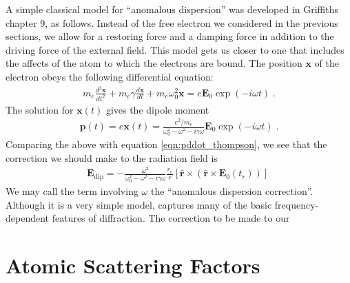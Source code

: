 \documentclass[12pt]{article}
\renewcommand{\vec}[1]{\boldsymbol{#1}}
\newcommand{\hvec}[1]{\hat{\vec{#1}}}
\begin{document}
A simple classical model for ``anomalous dispersion'' was developed in 
Griffiths chapter 9, as follows.  Instead of the free electron we considered in 
the previous sections, we allow for a restoring force and a damping force in 
addition to the driving force of the external field.  This model gets us 
closer to one that includes the affects of the atom to which the electrons 
are bound.  The position $\vec{x}$ of the electron obeys the following 
differential equation:
\begin{align}
m_e \frac{d^2\vec{x}}{dt^2} + m_e \gamma \frac{d\vec{x}}{dt} + m_e\omega_0^2 
\vec{x} = e \vec{E}_0 \exp(-i\omega t) \;.
\end{align}
The solution for $\vec{x}(t)$ gives the dipole moment
\begin{align}\label{eqn:dddipole}
\vec{p}(t) = e \vec{x}(t) = \frac{e^2/m_e}{\omega_0^2 - \omega^2 - i \gamma 
\omega}\vec{E}_0 \exp(-i\omega t) \;.
\end{align}
Comparing the above with equation \ref{eqn:pddot_thompson}, we see that the 
correction we should make to the radiation field is
\begin{align}
\vec{E}_\text{dip} =  -\frac{\omega^2}{\omega_0^2 - \omega^2 - i \gamma 
\omega}\frac{r_e}{r} [\hvec{r} \times ( \hvec{r} \times  
\vec{E}_0(t_r))] \;
\end{align}
We may call the term involving $\omega$ the ``anomalous dispersion correction''.
Although it is a very simple model, captures many of the basic 
frequency-dependent features of diffraction.  The correction to be made to our 


\section{Atomic Scattering Factors}
\end{document}
